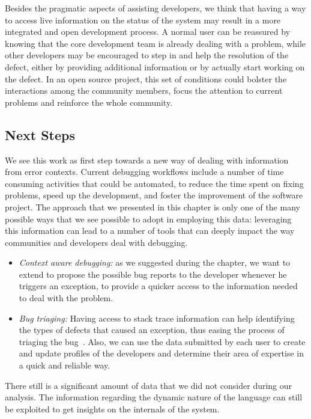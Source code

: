Besides the pragmatic aspects of assisting developers, we think that having a way to access live information on the status of the system may result in a more integrated and open development process.
A normal user can be reassured by knowing that the core development team is already dealing with a problem, while other developers may be encouraged to step in and help the resolution of the defect, either by providing additional information or by actually start working on the defect.
In an open source project, this set of conditions could bolster the interactions among the community members, focus the attention to current problems and reinforce the whole community.


\subsection{Next Steps}

We see this work as first step towards a new way of dealing with information from error contexts.
Current debugging workflows include a number of time consuming activities that could be automated, to reduce the time spent on fixing problems, speed up the development, and foster the improvement of the software project.
The approach that we presented in this chapter is only one of the many possible ways that we see possible to adopt in employing this data: leveraging this information can lead to a number of tools that can deeply impact the way communities and developers deal with debugging.
\begin{itemize}%
\item\textit{Context aware debugging:} as we suggested during the chapter, we want to extend \slr to propose the possible bug reports to the developer whenever he triggers an exception, to provide a quicker access to the information needed to deal with the problem.

\item\textit{Bug triaging:} Having access to stack trace information can help identifying the types of defects that caused an exception, thus easing the process of triaging the bug~\cite{Anvi2006a}.
Also, we can use the data submitted by each user to create and update profiles of the developers and determine their area of expertise in a quick and reliable way.

\end{itemize}

There still is a significant amount of data that we did not consider during our analysis.
The information regarding the dynamic nature of the language can still be exploited to get insights on the internals of the system.

